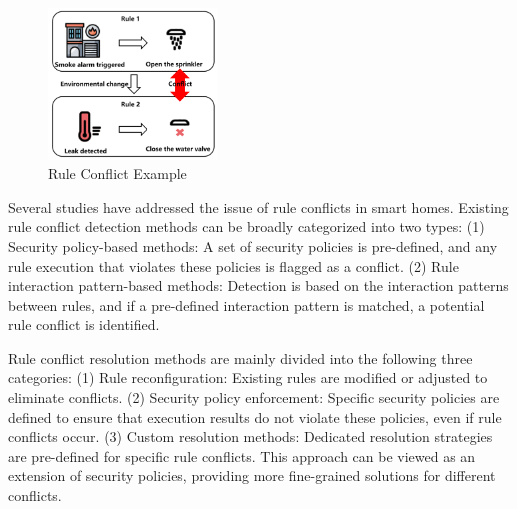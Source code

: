 \begin{figure}[htbp]
	\centering
	\includegraphics[width=0.4\textwidth]{figure/rule_conflict_example.png}
	\caption{Rule Conflict Example}
	\label{rule_conflict_example}
\end{figure}

Several studies have addressed the issue of rule conflicts in smart homes\cite{alhanahnah2020scalable,chen2019multi,chi2020cross,ding2021iotsafe,huang2021conflict,li2020diac,xiao2019a3id,nakamura2005feature,igaki2010modeling,ibrhim2020formal,pradeep2021automating,shehata2007using,sun2014conflict,alharithi2019detecting,celik2019iotguard,hamza2022hsas,leelaprute2008detecting,trimananda2020understanding,yagita2015application,yu2022tapinspector,chaki2020fine,chi2023detecting,celik2018soteria,alhanahnah2022iotcom,ding2018safety,hsu2019safechain,wang2019charting}. Existing rule conflict detection methods can be broadly categorized into two types: (1) Security policy-based methods: A set of security policies is pre-defined, and any rule execution that violates these policies is flagged as a conflict\cite{celik2018soteria,celik2019iotguard,ding2021iotsafe}. (2) Rule interaction pattern-based methods: Detection is based on the interaction patterns between rules, and if a pre-defined interaction pattern is matched, a potential rule conflict is identified\cite{chi2020cross,chi2023detecting,celik2019iotguard,alhanahnah2022iotcom}.

Rule conflict resolution methods are mainly divided into the following three categories: (1) Rule reconfiguration: Existing rules are modified or adjusted to eliminate conflicts\cite{celik2018soteria,chen2019multi,chi2020cross,ding2018safety,hsu2019safechain,wang2019charting}. (2) Security policy enforcement\cite{celik2019iotguard,ding2021iotsafe}: Specific security policies are defined to ensure that execution results do not violate these policies, even if rule conflicts occur. (3) Custom resolution methods\cite{chi2023detecting}: Dedicated resolution strategies are pre-defined for specific rule conflicts. This approach can be viewed as an extension of security policies, providing more fine-grained solutions for different conflicts.

